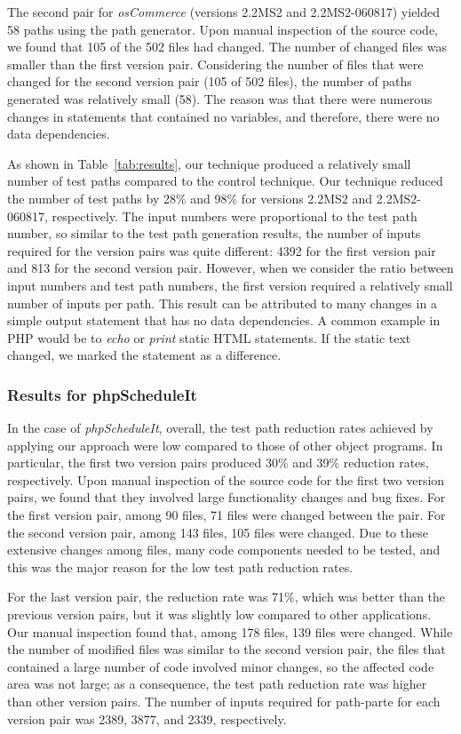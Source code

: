 The second pair for {\em osCommerce} (versions 2.2MS2 and 2.2MS2-060817) 
yielded 58 paths using the path generator. Upon manual inspection of 
the source code,  we found that 105 of the 502 files had changed. 
The number of changed files was smaller than the first version pair.
Considering the number of files that were changed for the second version
pair (105 of 502 files), the number of paths generated was relatively 
small (58). The reason was that there were numerous changes in statements 
that contained no variables, and therefore, there were no data 
dependencies. 

As shown in Table~\ref{tab:results}, our technique produced a relatively 
small number of test paths compared to the control technique. 
Our technique reduced the number of test paths by 28\% and 98\% 
for versions 2.2MS2 and 2.2MS2-060817, respectively. 
The input numbers were proportional to the test path number, so
similar to the test path generation results, the number of inputs
required for the version pairs was quite different: 4392 for the first
version pair and 813 for the second version pair.
However, when we consider the ratio between input numbers and test path 
numbers, the first version required a relatively small number of inputs
per path. This result can be attributed to many changes in a simple output 
statement that has no data dependencies. A common example in PHP would 
be to \textit{echo} or \textit{print} static HTML statements.
If the static text changed, we marked the statement as a difference.

\subsubsection{Results for phpScheduleIt}

In the case of {\em phpScheduleIt}, overall,
the test path reduction rates achieved by applying our approach
were low compared to those of other object programs.
In particular, the first two version pairs produced 30\% and 39\%
reduction rates, respectively.
Upon manual inspection of the source code for the first two version
pairs, we found that they involved large functionality 
changes and bug fixes. For the first version pair, among 90 files, 
71 files were changed between the pair. For the second version pair, 
among 143 files, 105 files were changed. 
Due to these extensive changes among files, many code
components needed to be tested, and this was the major reason
for the low test path reduction rates.

For the last version pair, the reduction rate was 71\%, which 
was better than the previous version pairs, but it was slightly 
low compared to other applications.
Our manual inspection found that, among 178 files, 139 files were changed.
While the number of modified files was similar to the second version
pair, the files that contained a large number of code involved minor changes,
so the affected code area was not large; as a consequence, the test path 
reduction rate was higher than other version pairs.
The number of inputs required for path-parte for each version pair
was 2389, 3877, and 2339, respectively.

